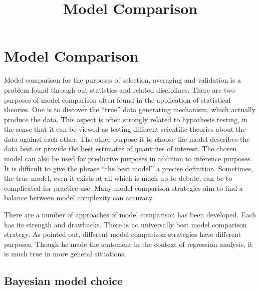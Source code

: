 \ifx\inthesis\undefined %

\title{Model Comparison}

\maketitle
\else %
\chapter{Model Comparison}
\label{cha:Model Comparison}
\fi %

Model comparison for the purposes of selection, averaging and validation is a
problem found through out statistics and related disciplines. There are two
purposes of model comparison often found in the application of statistical
theories. One is to discover the ``true'' data generating mechanism, which
actually produce the data. This aspect is often strongly related to hypothesis
testing, in the sense that it can be viewed as testing different scientific
theories about the data against each other. The other purpose it to choose the
model describes the data best or provide the best estimates of quantities of
interest. The chosen model can also be used for predictive purposes in
addition to inference purposes. It is difficult to give the phrase ``the best
model'' a precise definition. Sometimes, the true model, even it exists at all
which is much up to debate, can be to complicated for practice use. Many model
comparison strategies aim to find a balance between model complexity can
accuracy.

There are a number of approaches of model comparison has been developed. Each
has its strength and drawbacks. There is no universally best model comparison
strategy. As \cite[][chap.~4]{Myers:1990wt} pointed out, different model
comparison strategies have different purposes. Though he made the statement in
the context of regression analysis, it is much true in more general
situations.

\section{Bayesian model choice}
\label{sec:Bayesian model choice}

